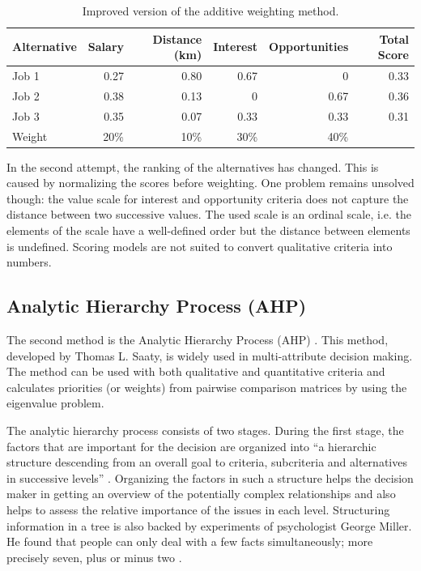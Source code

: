 \begin{table}[h]
    \begin{center}
        \begin{tabular}{lrrrrr}
            \hline
            Alternative & Salary & Distance (km) & Interest & Opportunities & Total Score \\
            \hline
            Job 1       & 0.27   & 0.80          & 0.67     & 0             & 0.33        \\
            Job 2       & 0.38   & 0.13          & 0        & 0.67          & 0.36        \\
            Job 3       & 0.35   & 0.07          & 0.33     & 0.33          & 0.31        \\
            \hline
            Weight      & 20\%   & 10\%          & 30\%     & 40\%          &             \\
            \hline
        \end{tabular}
        \caption{Improved version of the additive weighting method.}
        \label{tab:sm1}
    \end{center}
\end{table}

In the second attempt, the ranking of the alternatives has changed. This is caused by normalizing the scores before weighting. One problem remains unsolved though: the value scale for interest and opportunity criteria does not capture the distance between two successive values. The used scale is an ordinal scale, i.e. the elements of the scale have a well-defined order but the distance between elements is undefined. Scoring models are not suited to convert qualitative criteria into numbers.

\subsection{Analytic Hierarchy Process (AHP)}
\label{sec:ahp}

The second method is the Analytic Hierarchy Process (AHP) \cite{Saaty:1980}. This method, developed by Thomas L. Saaty, is widely used in multi-attribute decision making. The method can be used with both qualitative and quantitative criteria and calculates priorities (or weights) from pairwise comparison matrices by using the eigenvalue problem. 

The analytic hierarchy process consists of two stages. During the first stage, the factors that are important for the decision are organized into ``a hierarchic structure descending from an overall goal to criteria, subcriteria and alternatives in successive levels'' \cite{Saaty:1990}. Organizing the factors in such a structure helps the decision maker in getting an overview of the potentially complex relationships and also helps to assess the relative importance of the issues in each level. Structuring information in a tree is also backed by experiments of psychologist George Miller. He found that people can only deal with a few facts simultaneously; more precisely seven, plus or minus two \cite{Miller:1956}. 

